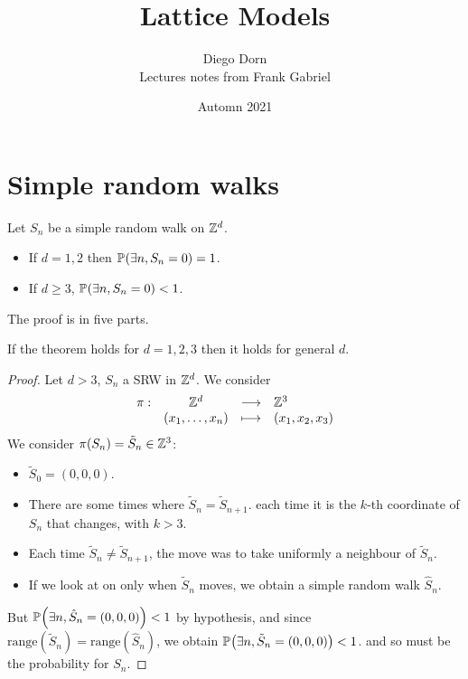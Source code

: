 


\title{Lattice Models}
\author{Diego Dorn \\ Lectures notes from Frank Gabriel}
\date{Automn 2021}

\newcommand{\Isom}{\mathrm{Isom}}
\newcommand{\Acts}{\curvearrowright}
\renewcommand{\P}[1]{\mathbb{P}\hspace{-0.3ex}\left(#1\right)}
\newcommand{\Pcond}[2]{\mathbb{P}\hspace{-0.3ex}\left(#1 \middle| #2 \right)}
\newcommand{\E}[1]{\mathbb{E}\left[#1\right]}
\newcommand{\Fourrier}{\mathcal F}


    \maketitle

    \section{Simple random walks}

    \begin{theorem}
        Let $S_n$ be a simple random walk on $\mathbb Z^d$.
        \begin{itemize}
            \item If $d = 1, 2$ then $\P{\exists n, S_n = 0} = 1$.
            \item If $d \geq 3$, $\P{\exists n, S_n = 0} < 1$.
        \end{itemize}
    \end{theorem}

    The proof is in five parts.

    \begin{claim}
        If the theorem holds for $d = 1, 2, 3$ then it holds for general $d$.
    \end{claim}
    \begin{proof}
        Let $d > 3$, $S_n$ a SRW in $\mathbb Z^d$.
        We consider \[
            \begin{array}{rccl} \pi : & \mathbb Z^d & \longrightarrow & \mathbb Z^3 \\ & (x_1, \dots, x_n) & \longmapsto & (x_1, x_2, x_3) \end{array}
        \]
        We consider $\pi(S_n) = \tilde{S}_n \in \mathbb Z^3$:
        \begin{itemize}
            \item $\tilde{S}_0 = (0, 0, 0)$.
            \item There are some times where $\tilde{S}_n = \tilde{S}_{n+1}$.
                each time it is the $k$-th coordinate of $S_n$ that changes, with $k > 3$.
            \item Each time $\tilde{S}_n \neq \tilde{S}_{n+1}$, 
                the move was to take uniformly a neighbour of $\tilde{S}_n$.
            \item If we look at on only when $\tilde{S}_n$ moves,
                we obtain a simple random walk $\hat{S}_n$.
        \end{itemize}
        But $\P{\exists n, \hat S_n = (0, 0, 0)} < 1$ by hypothesis, 
        and since $\mathrm{range}(\tilde S_n) = \mathrm{range}(\hat S_n)$,
        we obtain
        $\P{\exists n, \tilde S_n = (0, 0, 0)} < 1$.
        and so must be the probability for $S_n$.
    \end{proof}

